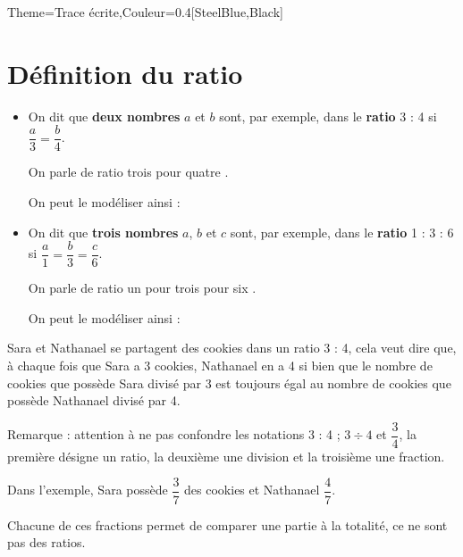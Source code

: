 \begin{Maquette}[Cours]{Theme={Trace écrite},Couleur={0.4[SteelBlue,Black]}}

   \section{Définition du ratio}

      \begin{definition*}{}
         \begin{itemize}
            \item On dit que {\bf deux nombres} $a$ et $b$ sont, par exemple, dans le {\bf ratio} 3 : 4 si $\dfrac{a}{3} =\dfrac{b}{4}$. \par
               On parle de ratio \og trois pour quatre \fg. \par \smallskip
               On peut le modéliser ainsi : \parbox{7cm}{}
            \item On dit que {\bf trois nombres} $a$, $b$ et $c$ sont, par exemple, dans le {\bf ratio} 1 : 3 : 6 si $\dfrac{a}{1} =\dfrac{b}{3} = \dfrac{c}{6}$. \par
               On parle de ratio \og un pour trois pour six \fg. \par \smallskip
               On peut le modéliser ainsi : \parbox{7cm}{}
         \end{itemize}
      \end{definition*}

      \begin{exemple*}{}
         Sara et Nathanael se partagent des cookies dans un ratio 3 : 4, cela veut dire que, à chaque fois que Sara a 3 cookies, Nathanael en a 4 si bien que le nombre de cookies que possède Sara divisé par 3 est toujours égal au nombre de cookies que possède Nathanael divisé par 4.
      \end{exemple*}

      Remarque : attention à ne pas confondre les notations 3 : 4 ; $3\div4$ et $\dfrac34$, la première désigne un ratio, la deuxième une division et la troisième une fraction. \par
         Dans l'exemple, Sara possède $\dfrac37$ des cookies et Nathanael $\dfrac47$. \par \smallskip
         Chacune de ces fractions permet de comparer une partie à la totalité, ce ne sont pas des ratios.



\end{Maquette}

